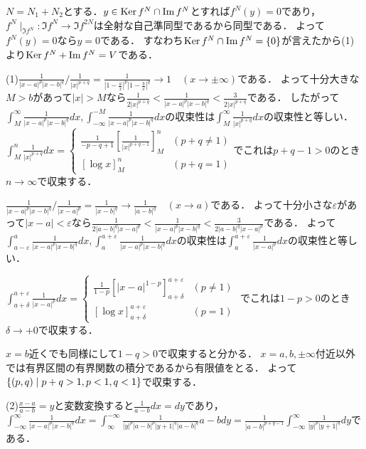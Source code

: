 \documentclass[
		book,
		head_space=20mm,
		foot_space=20mm,
		gutter=10mm,
		line_length=190mm
]{jlreq}
\begin{document}
$N=N_1+N_2$とする．$y\in \mathop{\mathrm{Ker}} f^N\cap \mathop{\mathrm{Im}} f^N$とすれば$f^N(y)=0$であり，$f^N\mid_{\Im f^N}\colon \Im f^N\rightarrow \Im f^{2N}$は全射な自己準同型であるから同型である．
よって$f^N(y)=0$なら$y=0$である．
すなわち$\mathop{\mathrm{Ker}} f^N\cap \mathop{\mathrm{Im}} f^N=\left\{ 0 \right\}$が言えたから(1)より$\mathop{\mathrm{Ker}} f^N+\mathop{\mathrm{Im}} f^N=V$である．

(1)$\frac{1}{|x-a|^p|x-b|^q}/\frac{1}{|x|^{p+q}}=\frac{1}{|1-\frac{a}{x}|^p|1-\frac{b}{x}|^q}\rightarrow 1\quad(x\to \pm\infty)$である．
よって十分大きな$M>b$があって$|x|>M$なら$\frac{1}{2|x|^{p+q}}<\frac{1}{|x-a|^p|x-b|^q}<\frac{3}{2|x|^{p+q}}$である．
したがって$\int_M^\infty \frac{1}{|x-a|^p|x-b|^q} dx,\int_{-\infty}^{-M} \frac{1}{|x-a|^p|x-b|^q}dx$の収束性は$\int_M^\infty\frac{1}{|x|^{p+q}}dx$の収束性と等しい．
$\int_M^n \frac{1}{|x|^{p+q}}dx=\begin{cases}
    \frac{1}{-p-q+1}\left[ \frac{1}{|x|^{p+q-1}} \right]_M^n &(p+q\neq 1)\\
    \left[ \log x \right]_M^n &(p+q=1)
\end{cases}$でこれは$p+q-1>0$のとき$n\to \infty$で収束する．

$\frac{1}{|x-a|^p|x-b|^q}/\frac{1}{|x-a|^{p}}=\frac{1}{|x-b|^q}\rightarrow \frac{1}{|a-b|^q}\quad(x\to a)$である．
よって十分小さな$\varepsilon$があって$|x-a|<\varepsilon$なら$\frac{1}{2|a-b|^q|x-a|^p}<\frac{1}{|x-a|^p|x-b|^q}<\frac{3}{2|a-b|^q|x-a|^p}$である．
よって$\int_{a-\varepsilon}^a \frac{1}{|x-a|^p|x-b|^q}dx,\int_a^{a+\varepsilon}\frac{1}{|x-a|^p|x-b|^q}dx$の収束性は$\int_a^{a+\varepsilon}\frac{1}{|x-a|^p}dx$の収束性と等しい．

$\int_{a+\delta}^{a+\varepsilon}\frac{1}{|x-a|^p}dx=\begin{cases}
    \frac{1}{1-p}\left[ |x-a|^{1-p} \right]_{a+\delta}^{a+\varepsilon}&(p\neq 1)\\
    \left[ \log x \right]_{a+\delta}^{a+\varepsilon}&(p=1)
\end{cases}$
でこれは$1-p>0$のとき$\delta\rightarrow +0$で収束する．

$x=b$近くでも同様にして$1-q>0$で収束すると分かる．
$x=a,b,\pm\infty$付近以外では有界区間の有界関数の積分であるから有限値をとる．
よって$\left\{ (p,q)\mathrel{}\middle|\mathrel{}p+q>1,p<1,q<1 \right\}$で収束する．

(2)$\frac{x-a}{a-b}=y$と変数変換すると$\frac{1}{a-b}dx=dy$であり，
$\int_{-\infty}^\infty \frac{1}{|x-a|^p|x-b|^q}dx=\int_{\infty}^{-\infty} \frac{1}{|y|^p|a-b|^p|y+1|^q|a-b|^q}{a-b}dy=\frac{1}{|a-b|^{p+q-1}}\int_{-\infty}^\infty \frac{1}{|y|^p|y+1|^q}dy$である．
\end{document}
